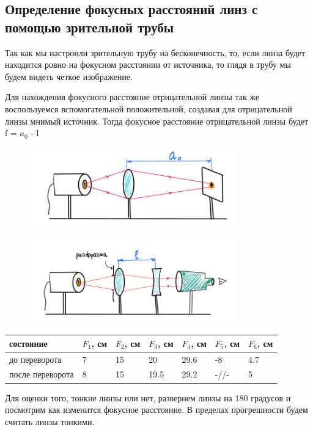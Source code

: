 \documentclass[a4paper,12pt]{article}
\theoremstyle{definition}
\begin{document}
\subsection{ Определение фокусных расстояний линз с помощью зрительной трубы}

Так как мы настроили зрительную трубу на бесконечность, то, если линза будет находится ровно на фокусном расстоянии от источника, то глядя в трубу мы будем видеть четкое изображение.

Для нахождения фокусного расстояние отрицательной линзы так же воспользуемся вспомогательной положительной, создавая для отрицательной линзы мнимый источник. Тогда фокусное расстояние отрицательной линзы будет f = $a_0$ - l


\begin{figure}[h]
    \centering
    \includegraphics[width=9cm]{d1.jpg}
    \label{fig:vac}
\end{figure}

\begin{figure}[h!]
    \centering
    \includegraphics[width=9cm]{d2.jpg}
    \label{fig:vac}
\end{figure}

\begin{table}[h!]
    \centering
    \begin{tabular}{|l|l|l|l|l|l|l|}
    \hline
    состояние & $F_1$, см & $F_2$, см  & $F_3$, см & $F_4$, см  & $F_5$, см  & $F_6$, см   \\ \hline
    до переворота & 7 & 15 & 20 & 29.6 & -8 & 4.7\\ \hline
    после переворота & 8 & 15 & 19.5 & 29.2 & -//- & 5\\ \hline
    \end{tabular}
\end{table}
Для оценки того, тонкие линзы или нет, развернем линзы на 180 градусов и посмотрим как изменится фокусное расстояние. В пределах прогрешности будем считать линзы тонкими.
\end{document}
